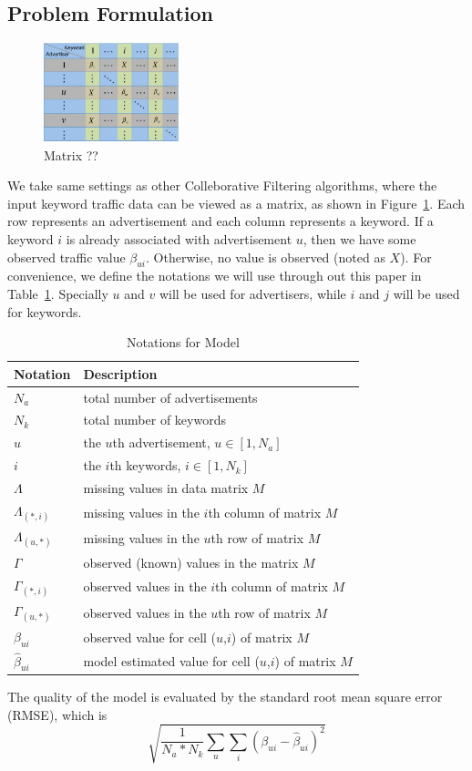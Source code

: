 \subsection{Problem Formulation}
\label{sec:problem}

\begin{figure}[!ht]
  \centering
  \includegraphics[width=0.35\textwidth]{figures/matrix.pdf}
  \caption{Matrix ??}
  \label{fig:problem-as-matrix}
\end{figure}
We take same settings as other Colleborative Filtering algorithms,
where the input keyword traffic data can be viewed as a matrix, as
shown in Figure~\ref{fig:problem-as-matrix}. Each row represents an
advertisement and each column represents a keyword. If a keyword $i$
is already associated with advertisement $u$, then we have some
observed traffic value $\beta_{ui}$. Otherwise, no value is observed
(noted as $X$). For convenience, we define the notations we will use
through out this paper in Table~\ref{tab:notations}. Specially $u$ and
$v$ will be used for advertisers, while $i$ and $j$ will be used for
keywords.

\begin{table}[!ht]
  \centering
  \begin{tabular}{|l|l|}
    \hline
    Notation & Description \\ \hline
    $N_a$ & total number of advertisements \\ \hline
    $N_k$ & total number of keywords \\ \hline
    $u$ & the $u$th advertisement, $u\in [1,N_a]$\\ \hline
    $i$ & the $i$th keywords, $i\in [1,N_k]$\\ \hline
    $\Lambda$ & missing values in data matrix $M$\\ \hline
    $\Lambda_{(*,i)}$  & missing values in the $i$th column of matrix $M$\\ \hline
    $\Lambda_{(u,*)}$ & missing values in the $u$th row of matrix $M$\\ \hline
    $\Gamma$ & observed (known) values in the matrix $M$\\ \hline
    $\Gamma_{(*,i)}$ & observed values in the $i$th column of matrix $M$\\ \hline
    $\Gamma_{(u,*)}$& observed values in the $u$th row of matrix $M$\\     \hline
    $\beta_{ui}$& observed value for cell ($u$,$i$) of matrix $M$\\ \hline
    $\hat{\beta}_{ui}$& model estimated value for cell ($u$,$i$) of matrix $M$\\ \hline
  \end{tabular}
  \caption{Notations for {\sppan} Model}
\label{tab:notations}
\end{table}

The quality of the model is evaluated by the standard root mean square
error (RMSE), which is
\[
\sqrt{\frac{1}{N_a * N_k}\sum_u \sum_i \left(\beta_{ui}-\hat{\beta}_{ui}\right)^2}
\]
